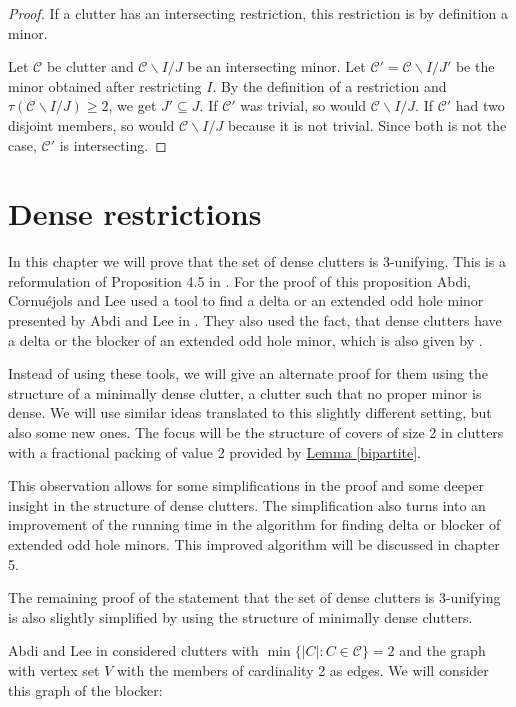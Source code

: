 \documentclass[a4paper, 12pt]{scrbook}
\theoremstyle{definition}
\begin{document}
  \begin{proof}
      If a clutter has an intersecting restriction, this restriction is by definition a minor.

      Let $\mathcal{C}$ be clutter and $\mathcal{C} \backslash I /J$ be an intersecting minor.
      Let $\mathcal{C'}=\mathcal{C} \backslash I /J'$ be the minor obtained after restricting $I$.
      By the definition of a restriction and $\tau(\mathcal{C} \backslash I /J) \geq 2$, we get $J' \subseteq J$. If $\mathcal{C'}$ was trivial, so would $\mathcal{C} \backslash I / J$.
      If $\mathcal{C'}$ had two disjoint members, so would $\mathcal{C} \backslash I /J$ because it is not trivial.
      Since both is not the case, $\mathcal{C'}$ is intersecting.
  \end{proof}


   \chapter{Dense restrictions}
   In this chapter we will prove that the set of dense clutters is 3-unifying.
   This is a reformulation of Proposition 4.5 in \cite{restrictions}.
   For the proof of this proposition Abdi, Cornuéjols and Lee used a tool to find a delta or an extended odd hole minor presented by Abdi and Lee in \cite{deltas}. They also used the fact, that dense clutters have a delta or the blocker of an extended odd hole minor, which is also given by \cite{deltas}.


   Instead of using these tools, we will give an alternate proof for them using the structure of a minimally dense clutter, a clutter such that no proper minor is dense.
   We will use similar ideas translated to this slightly different setting, but also some new ones.
   The focus will be the structure of covers of size 2 in clutters with a fractional packing of value 2 provided by \hyperref[bipartite]{Lemma \ref*{bipartite}}.

   This observation allows for some simplifications in the proof and some deeper insight in the structure of dense clutters.
   The simplification also turns into an improvement of the running time in the algorithm for finding delta or blocker of extended odd hole minors. This improved algorithm will be discussed in chapter 5.

The remaining proof of the statement that the set of dense clutters is 3-unifying is also slightly simplified by using the structure of minimally dense clutters.

Abdi and Lee in \cite{deltas} considered clutters with $\min\{|C|:C\in \mathcal{C}\}=2$ and the graph with vertex set $V$ with the members of cardinality 2 as edges. We will consider this graph of the blocker:
\end{document}
